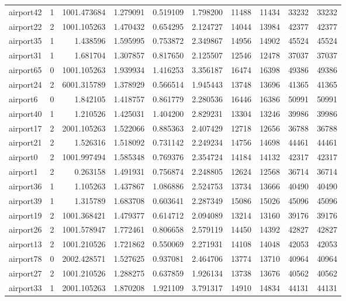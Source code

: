 \begin{longtable}{|l|r|r|r|r|r|r|r|r|r|}
airport42 & 1 & 1001.473684 & 1.279091 & 0.519109 & 1.798200 & 11488 & 11434 & 33232 & 33232 \\
airport22 & 2 & 1001.105263 & 1.470432 & 0.654295 & 2.124727 & 14044 & 13984 & 42377 & 42377 \\
airport35 & 1 & 1.438596 & 1.595995 & 0.753872 & 2.349867 & 14956 & 14902 & 45524 & 45524 \\
airport31 & 1 & 1.681704 & 1.307857 & 0.817650 & 2.125507 & 12546 & 12478 & 37037 & 37037 \\
airport65 & 0 & 1001.105263 & 1.939934 & 1.416253 & 3.356187 & 16474 & 16398 & 49386 & 49386 \\
airport24 & 2 & 6001.315789 & 1.378929 & 0.566514 & 1.945443 & 13748 & 13696 & 41365 & 41365 \\
airport6 & 0 & 1.842105 & 1.418757 & 0.861779 & 2.280536 & 16446 & 16386 & 50991 & 50991 \\
airport40 & 1 & 1.210526 & 1.425031 & 1.404200 & 2.829231 & 13304 & 13246 & 39986 & 39986 \\
airport17 & 2 & 2001.105263 & 1.522066 & 0.885363 & 2.407429 & 12718 & 12656 & 36788 & 36788 \\
airport21 & 2 & 1.526316 & 1.518092 & 0.731142 & 2.249234 & 14756 & 14698 & 44461 & 44461 \\
airport0 & 2 & 1001.997494 & 1.585348 & 0.769376 & 2.354724 & 14184 & 14132 & 42317 & 42317 \\
airport1 & 2 & 0.263158 & 1.491931 & 0.756874 & 2.248805 & 12624 & 12568 & 36714 & 36714 \\
airport36 & 1 & 1.105263 & 1.437867 & 1.086886 & 2.524753 & 13734 & 13666 & 40490 & 40490 \\
airport39 & 1 & 1.315789 & 1.683708 & 0.603641 & 2.287349 & 15086 & 15026 & 45096 & 45096 \\
airport19 & 2 & 1001.368421 & 1.479377 & 0.614712 & 2.094089 & 13214 & 13160 & 39176 & 39176 \\
airport26 & 2 & 1001.578947 & 1.772461 & 0.806658 & 2.579119 & 14450 & 14392 & 42827 & 42827 \\
airport13 & 2 & 1001.210526 & 1.721862 & 0.550069 & 2.271931 & 14108 & 14048 & 42053 & 42053 \\
airport78 & 0 & 2002.428571 & 1.527625 & 0.937081 & 2.464706 & 13774 & 13710 & 40964 & 40964 \\
airport27 & 2 & 1001.210526 & 1.288275 & 0.637859 & 1.926134 & 13738 & 13676 & 40562 & 40562 \\
airport33 & 1 & 2001.105263 & 1.870208 & 1.921109 & 3.791317 & 14910 & 14834 & 44131 & 44131 \\

\end{longtable}

